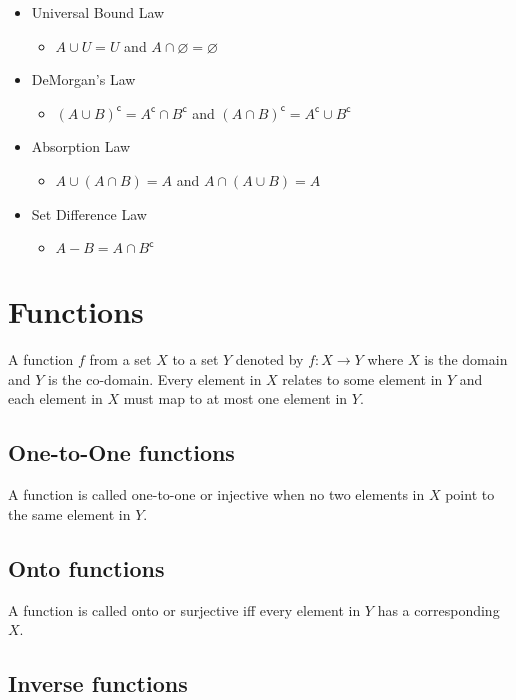 \documentclass[landscape, letterpaper]{article}
\renewcommand{\complement}[1]{{#1}^\mathsf{c}}
\begin{document}
\begin{multicols}{2}
\begin{itemize}
        \item Universal Bound Law
              \begin{itemize}
                  \item $A \cup U = U$ and $A  \cap \varnothing = \varnothing$
              \end{itemize}
        \item DeMorgan's Law
              \begin{itemize}
                  \item $\complement{(A \cup B)} = \complement{A} \cap \complement{B}$ and $\complement{(A \cap B)} = \complement{A} \cup \complement{B}$
              \end{itemize}
        \item Absorption Law
              \begin{itemize}
                  \item $A \cup (A \cap B) = A$ and $A \cap (A \cup B) = A$
              \end{itemize}
        \item Set Difference Law
              \begin{itemize}
                  \item $A-B = A \cap \complement{B}$
              \end{itemize}
    \end{itemize}
    \section*{Functions}
    A function $f$ from a set $X$ to a set $Y$ denoted by $f: X \to Y$ where $X$ is the domain and $Y$ is the co-domain.
    Every element in $X$ relates to some element in $Y$ and each element in $X$ must map to at most one element in $Y$.
    \subsection*{One-to-One functions}
    A function is called one-to-one or injective when no two elements in $X$ point to the same element in $Y$.
    \subsection*{Onto functions}
    A function is called onto or surjective iff every element in $Y$ has a corresponding $X$.
    \subsection*{Inverse functions}

\end{multicols}
\end{document}
